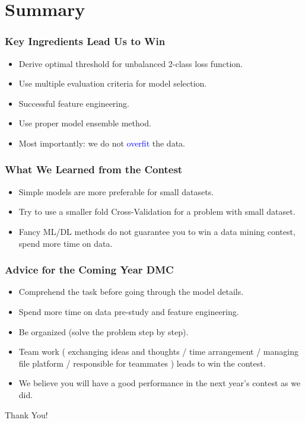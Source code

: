 \documentclass{beamer}
\begin{document}
\section{Summary}

\begin{frame}
\frametitle{Key Ingredients Lead Us to Win}

\begin{itemize}
\item Derive optimal threshold for unbalanced 2-class loss function.
\item Use multiple evaluation criteria for model selection.
\item Successful feature engineering.
\item Use proper model ensemble method.
\item Most importantly: we do not \textcolor{blue}{overfit} the data.
\end{itemize}

\end{frame}



\begin{frame}
\frametitle{What We Learned from the Contest}

\begin{itemize}
\item Simple models are more preferable for small datasets.
\item Try to use a smaller fold Cross-Validation for a problem with small dataset.
\item Fancy ML/DL methods do not guarantee you to win a data mining contest, spend more time on data.
\end{itemize}

\end{frame}




\begin{frame}
\frametitle{Advice for the Coming Year DMC}

\begin{itemize}
\item Comprehend the task before going through the model details.
\item  Spend more time on data pre-study and feature engineering.
\item Be organized (solve the problem step by step).
\item Team work ( exchanging ideas and thoughts / time arrangement / managing file platform / responsible for teammates ) leads to win the contest.
\item We believe you will have a good performance in the next year's contest as we did.
\end{itemize}

\end{frame}




\begin{frame}%
\begin{center}
\Huge Thank You!
\end{center}
\end{frame}
\end{document}
